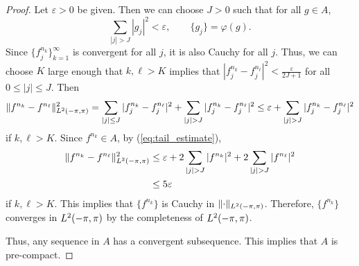 \documentclass{homework}
\begin{document}
\begin{arabicparts}
\begin{proof}
			Let $\varepsilon > 0$ be given. Then we can choose $J > 0$ such that for all $g \in A$,
			\begin{equation}
				\label{eq:tail_estimate}
				\sum_{|j| > J}|g_j|^2 < \varepsilon, \qquad \{g_j\} = \varphi(g).
			\end{equation}
			Since $\{f^{n_k}_j\}_{k=1}^\infty$ is convergent for all $j$, it is also Cauchy for all $j$. Thus, we can choose $K$ large enough that $k,\ell > K$ implies that $|f^{n_k}_j - f^{n_\ell}_j|^2 < \frac{\varepsilon}{2J+1}$ for all $0 \le |j| \le J$. Then
			\begin{equation}
				\lVert f^{n_k} - f^{n_\ell}\rVert_\ltwo^2 = \sum_{|j| \le J}|f^{n_k}_j - f^{n_\ell}_j|^2 + \sum_{|j|>J}|f^{n_k}_j - f^{n_\ell}_j|^2 \le \varepsilon + \sum_{|j|>J}|f^{n_k}_j - f^{n_\ell}_j|^2
			\end{equation}
			if $k,\ell > K$. Since $f^{n_k} \in A$, by (\ref{eq:tail_estimate}),
			\begin{align}
				\lVert f^{n_k} - f^{n_\ell}\rVert_\ltwo^2 &\le \varepsilon + 2\sum_{|j|> J}|f^{n_k}|^2 + 2\sum_{|j|>J}|f^{n_\ell}|^2\\
				&\le 5\varepsilon
			\end{align}
			if $k,\ell > K$. This implies that $\{f^{n_k}\}$ is Cauchy in $\lVert\cdot\rVert_{L^2(-\pi,\pi)}$. Therefore, $\{f^{n_k}\}$ converges in ${L^2(-\pi,\pi)}$ by the completeness of ${L^2(-\pi,\pi)}$.
			
			Thus, any sequence in $A$ has a convergent subsequence. This implies that $A$ is pre-compact.
		\end{proof}
	\end{arabicparts}
\end{document}
